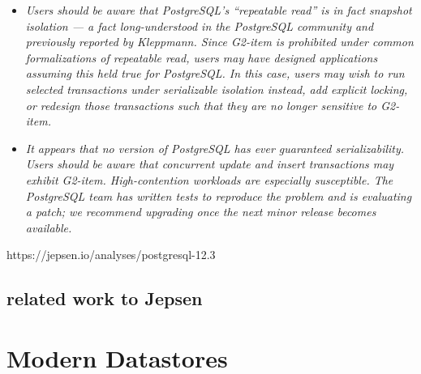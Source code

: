 \documentclass[a4paper,10pt,titlepage]{report}
\begin{document}
\begin{itemize}
    \item \textit{Users should be aware that PostgreSQL’s “repeatable read” is in fact snapshot isolation — a fact long-understood in the PostgreSQL community and previously reported by Kleppmann. Since G2-item is prohibited under common formalizations of repeatable read, users may have designed applications assuming this held true for PostgreSQL. In this case, users may wish to run selected transactions under serializable isolation instead, add explicit locking, or redesign those transactions such that they are no longer sensitive to G2-item.}
    \item \textit{It appears that no version of PostgreSQL has ever guaranteed serializability. Users should be aware that concurrent update and insert transactions may exhibit G2-item. High-contention workloads are especially susceptible. The PostgreSQL team has written tests to reproduce the problem and is evaluating a patch; we recommend upgrading once the next minor release becomes available.}
\end{itemize}
https://jepsen.io/analyses/postgresql-12.3

\section{related work to Jepsen}









    \newpage


    \chapter{Modern Datastores}
\end{document}

